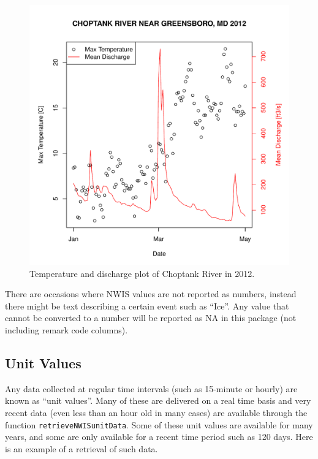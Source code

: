 \documentclass[a4paper,11pt]{article}\usepackage[]{graphicx}\usepackage[]{color}
\newenvironment{knitrout}{}{} %
\begin{document}
\begin{knitrout}
\begin{figure}[]
\includegraphics[width=1\linewidth,height=1\linewidth]{figure/getNWIStemperaturePlot} \caption[Temperature and discharge plot of Choptank River in 2012]{Temperature and discharge plot of Choptank River in 2012.\label{fig:getNWIStemperaturePlot}}
\end{figure}


\end{knitrout}


There are occasions where NWIS values are not reported as numbers, instead there might be text describing a certain event such as \enquote{Ice}.  Any value that cannot be converted to a number will be reported as NA in this package (not including remark code columns).

\FloatBarrier

\subsection{Unit Values}
\label{sec:usgsRT}
Any data collected at regular time intervals (such as 15-minute or hourly) are known as \enquote{unit values}. Many of these are delivered on a real time basis and very recent data (even less than an hour old in many cases) are available through the function \texttt{retrieveNWISunitData}.  Some of these unit values are available for many years, and some are only available for a recent time period such as 120 days.  Here is an example of a retrieval of such data.  
\end{document}
